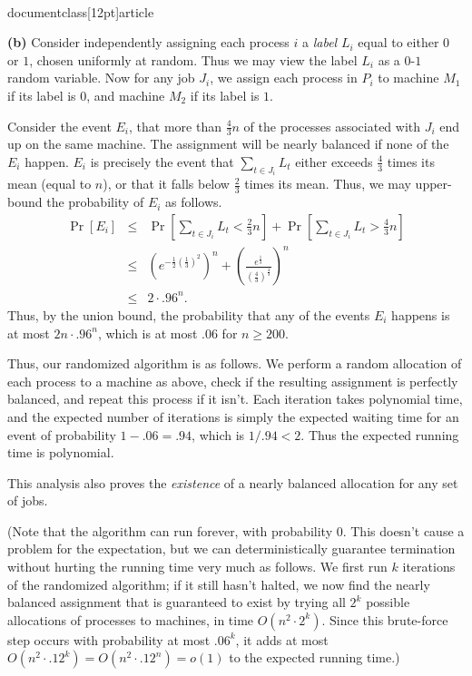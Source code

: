 \\documentclass[12pt]{article}
\begin{document}
\begin{enumerate}
{%


{\bf (b)} Consider independently
assigning each process $i$ a {\em label} $L_i$
equal to either $0$ or $1$, chosen uniformly at random.
Thus we may view the label $L_i$ as a $0$-$1$ random variable.
Now for any job $J_i$, we assign each process in $P_i$
to machine $M_1$ if its label is $0$,
and machine $M_2$ if its label is $1$.

Consider the event $E_i$,
that more than $\frac43 n$ of the processes
associated with $J_i$ end up on the same machine.
The assignment will be nearly balanced if none of the $E_i$ happen.
$E_i$ is precisely the event that
$\sum_{t \in J_i} L_t$ either exceeds $\frac43$ times
its mean (equal to $n$), or that it falls below $\frac23$
times its mean.
Thus, we may upper-bound the probability of $E_i$ as follows.
\begin{eqnarray*}
\Pr[E_i] & \leq & \Pr[\sum_{t \in J_i} L_t < \frac23 n]
+ \Pr[\sum_{t \in J_i} L_t > \frac43 n] \\
& \leq & \left(e^{-\frac12 (\frac13)^2}\right)^n +
\left(\frac{e^{\frac13}}{\left(\frac43\right)^{\frac43}}\right)^n \\
& \leq & 2 \cdot .96^n.
\end{eqnarray*}
Thus, by the union bound, the probability that
any of the events $E_i$ happens is at most
$2 n \cdot .96^n$, which is
at most $.06$ for $n \geq 200$.

Thus, our randomized algorithm is as follows.
We perform a random allocation of each process to a machine as above,
check if the resulting assignment is perfectly balanced,
and repeat this process if it isn't.
Each iteration takes polynomial time,
and the expected number of iterations is simply the expected waiting
time for an event of probability $1 - .06 = .94$,
which is $1 / .94 < 2$.
Thus the expected running time is polynomial.

This analysis also proves the {\em existence} of a nearly
balanced allocation for any set of jobs.

(Note that the algorithm can run forever, with probability $0$.
This doesn't cause a problem for the expectation,
but we can deterministically guarantee termination without
hurting the running time very much as follows.
We first run $k$ iterations of the randomized algorithm;
if it still hasn't halted, we now find the
nearly balanced assignment that is guaranteed to exist
by trying all $2^k$ possible
allocations of processes to machines, in time
$O(n^2 \cdot 2^k)$.
Since this brute-force step occurs with probability
at most $.06^k$, it adds at most
$O(n^2 \cdot .12^k) = O(n^2 \cdot .12^n) = o(1)$
to the expected running time.)


}
\end{enumerate}
\end{document}

